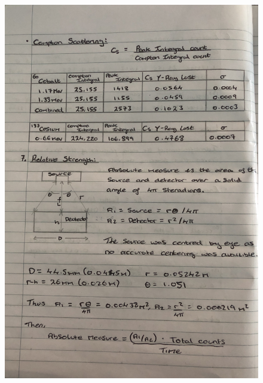 \documentclass[12pt]{article}
\begin{document}
\begin{figure}[H]
\centering
\includegraphics[scale=0.175]{Images/IMG_0333.JPG}
\end{figure}
\newpage
\end{document}
